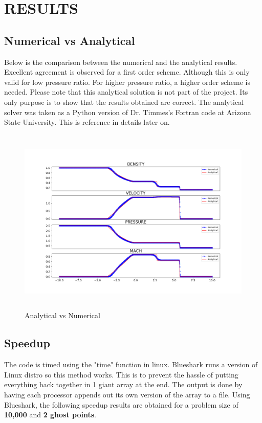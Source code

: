 \documentclass[12pt]{article}
\begin{document}
    \section{RESULTS}

    \subsection{Numerical vs Analytical}
    Below is the comparison between the numerical and the analytical results. Excellent agreement is observed for a first order scheme. Although this is only valid for low pressure ratio. For higher pressure ratio, a higher order scheme is needed.  Please note that this analytical solution is not part of the project.  Its only purpose is to show that the results obtained are correct. The analytical solver was taken as a Python version of Dr. Timmes's Fortran code at Arizona State University.  This is reference in details later on. 



    \begin{figure}[H]
        \begin{center}
        \includegraphics[height = 90mm,width = 160mm]{ana_num.png}              
        \caption{Analytical vs Numerical}
        \end{center}  
    \end{figure}    
    \noindent
    \subsection{Speedup}
    The code is timed using the "time" function in linux.  Blueshark runs a version of Linux distro so this method works. This is to prevent the hassle of putting everything back together in 1 giant array at the end. The output is done by having each processor appends out its own version of the array to a file. 
    Using Blueshark, the following speedup results are obtained for a problem size of \textbf{10,000} and \textbf{2 ghost points}. 
\end{document}
